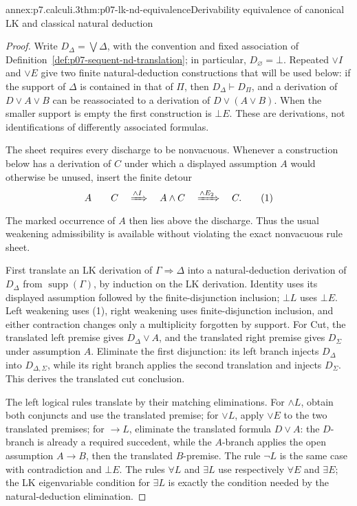 
\begin{annexitem}{annex:p7.calculi.3}{thm:p07-lk-nd-equivalence}{Derivability equivalence of canonical LK and classical natural deduction}
\begin{proof}
Write \(D_{\Delta}=\bigvee\Delta\), with the convention and fixed association
of Definition~\ref{def:p07-sequent-nd-translation}; in particular,
\(D_{\varnothing}=\bot\).  Repeated \(\lor I\) and \(\lor E\) give two finite
natural-deduction constructions that will be used below: if the support of
\(\Delta\) is contained in that of \(\Pi\), then
\(D_{\Delta}\vdash D_{\Pi}\), and a derivation of
\(D\lor A\lor B\) can be reassociated to a derivation of
\(D\lor(A\lor B)\).  When the smaller support is empty the first construction
is \(\bot E\).  These are derivations, not identifications of differently
associated formulas.

The sheet requires every discharge to be nonvacuous.  Whenever a construction
below has a derivation of \(C\) under which a displayed assumption \(A\) would
otherwise be unused, insert the finite detour
\[
 A\qquad C\quad\xRightarrow{\land I}\quad A\land C
 \quad\xRightarrow{\land E_2}\quad C.
 \tag{1}
\]
The marked occurrence of \(A\) then lies above the discharge.  Thus the usual
weakening admissibility is available without violating the exact nonvacuous
rule sheet.

First translate an LK derivation of \(\Gamma\Rightarrow\Delta\) into a
natural-deduction derivation of \(D_{\Delta}\) from
\(\operatorname{supp}(\Gamma)\), by induction on the LK derivation.  Identity
uses its displayed assumption followed by the finite-disjunction inclusion;
\(\bot L\) uses \(\bot E\).  Left weakening uses (1), right weakening uses
finite-disjunction inclusion, and either contraction changes only a
multiplicity forgotten by support.  For Cut, the translated left premise gives
\(D_{\Delta}\lor A\), and the translated right premise gives
\(D_{\Sigma}\) under assumption \(A\).  Eliminate the first disjunction:
its left branch injects \(D_{\Delta}\) into
\(D_{\Delta,\Sigma}\), while its right branch applies the second translation
and injects \(D_{\Sigma}\).  This derives the translated cut conclusion.

The left logical rules translate by their matching eliminations.  For
\(\land L\), obtain both conjuncts and use the translated premise; for
\(\lor L\), apply \(\lor E\) to the two translated premises; for
\(\to L\), eliminate the translated formula \(D\lor A\): the \(D\)-branch
is already a required succedent, while the \(A\)-branch applies the open
assumption \(A\to B\), then the translated \(B\)-premise.  The rule
\(\neg L\) is the same case with contradiction and \(\bot E\).  The rules
\(\forall L\) and \(\exists L\) use respectively \(\forall E\) and
\(\exists E\); the LK eigenvariable condition for \(\exists L\) is exactly the
condition needed by the natural-deduction elimination.


\end{proof}
\end{annexitem}
